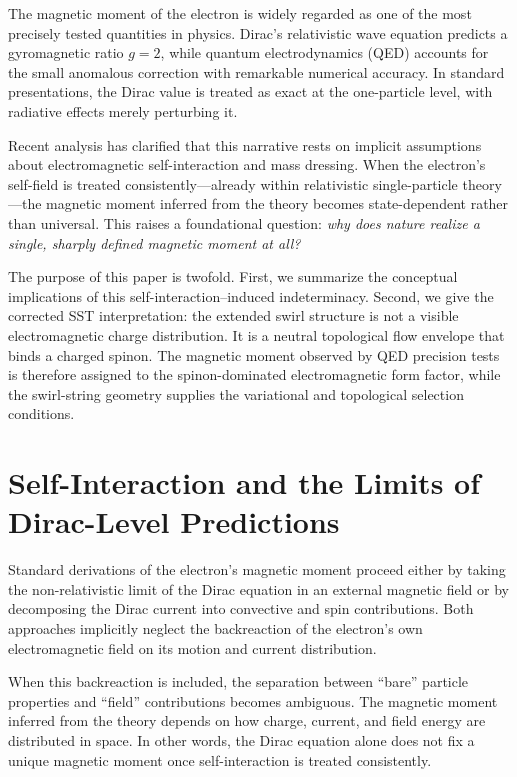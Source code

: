 \documentclass[pdflatex,sn-mathphys-num]{sn-jnl}
\theoremstyle{thmstyleone}
\theoremstyle{thmstyletwo}
\theoremstyle{thmstylethree}
\begin{document}
        The magnetic moment of the electron is widely regarded as one of the most precisely tested quantities in physics. Dirac’s relativistic wave equation predicts a gyromagnetic ratio $g=2$, while quantum electrodynamics (QED) accounts for the small anomalous correction with remarkable numerical accuracy. In standard presentations, the Dirac value is treated as exact at the one-particle level, with radiative effects merely perturbing it.

        Recent analysis has clarified that this narrative rests on implicit assumptions about electromagnetic self-interaction and mass dressing. When the electron’s self-field is treated consistently—already within relativistic single-particle theory—the magnetic moment inferred from the theory becomes state-dependent rather than universal. This raises a foundational question: \emph{why does nature realize a single, sharply defined magnetic moment at all?}

        The purpose of this paper is twofold. First, we summarize the conceptual implications of this self-interaction–induced indeterminacy. Second, we give the corrected SST interpretation: the extended swirl structure is not a visible electromagnetic charge distribution. It is a neutral topological flow envelope that binds a charged spinon. The magnetic moment observed by QED precision tests is therefore assigned to the spinon-dominated electromagnetic form factor, while the swirl-string geometry supplies the variational and topological selection conditions.

    \section{Self-Interaction and the Limits of Dirac-Level Predictions}
        \label{sec:selfinteraction}

        Standard derivations of the electron’s magnetic moment proceed either by taking the non-relativistic limit of the Dirac equation in an external magnetic field or by decomposing the Dirac current into convective and spin contributions. Both approaches implicitly neglect the backreaction of the electron’s own electromagnetic field on its motion and current distribution.

        When this backreaction is included, the separation between ``bare'' particle properties and ``field'' contributions becomes ambiguous. The magnetic moment inferred from the theory depends on how charge, current, and field energy are distributed in space. In other words, the Dirac equation alone does not fix a unique magnetic moment once self-interaction is treated consistently.
\end{document}
